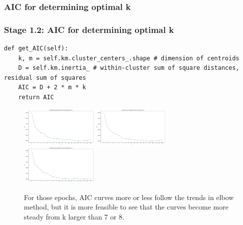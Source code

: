 \documentclass{tum-presentation}
\begin{document}
\subsubsection{AIC for determining optimal k}
\begin{frame}[fragile]
  \frametitle{Stage 1.2: AIC for determining optimal k}
  \begin{lstlisting}
def get_AIC(self):
    k, m = self.km.cluster_centers_.shape # dimension of centroids
    D = self.km.inertia_ # within-cluster sum of square distances, residual sum of squares 
    AIC = D + 2 * m * k
    return AIC
  \end{lstlisting}
  \begin{center}
    \begin{figure}[t]
      \includegraphics[width=0.33\textwidth]{images/AIC-1.png}
      \includegraphics[width=0.33\textwidth]{images/AIC-2.png}
      \includegraphics[width=0.33\textwidth]{images/AIC-3.png}
      \caption{For those epochs, AIC curves more or less follow the trends in elbow method, but it is more feasible to see that the curves become more steady from k larger than 7 or 8.}
    \end{figure}
  \end{center}
\end{frame}
\end{document}
